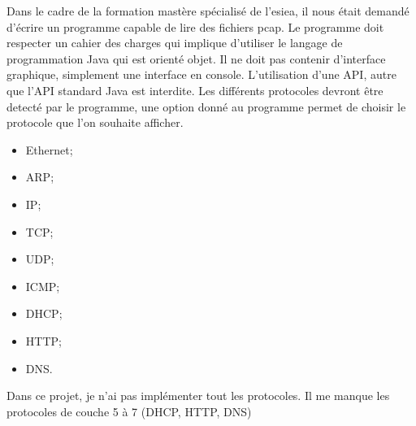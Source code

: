 Dans le cadre de la formation mastère spécialisé de l'esiea, il nous était demandé d'écrire un programme capable de lire des fichiers pcap. 
Le programme doit respecter un cahier des charges qui implique d'utiliser le langage de programmation Java qui est orienté objet. Il ne doit pas contenir d'interface graphique, simplement une interface en console. L'utilisation d'une API, autre que l'API standard Java est interdite.
Les différents protocoles devront être detecté par le programme, une option donné au programme permet de choisir le protocole que l'on souhaite afficher.
\begin{itemize}
    \item Ethernet;
    \item ARP;
    \item IP;
    \item TCP;
    \item UDP;
    \item ICMP;
    \item DHCP;
    \item HTTP;
    \item DNS.
\end{itemize}
Dans ce projet, je n'ai pas implémenter tout les protocoles. Il me manque les protocoles de couche 5 à 7 (DHCP, HTTP, DNS)
